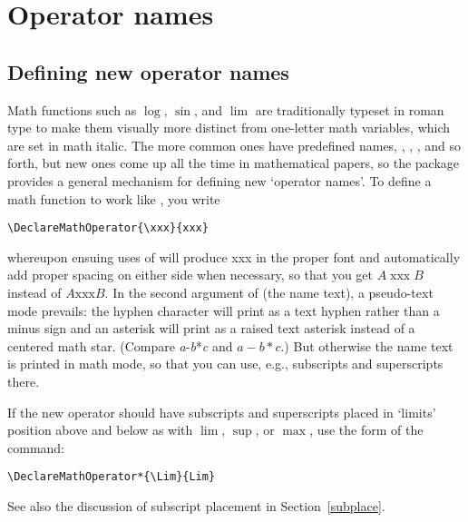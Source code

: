 \documentclass[leqno,titlepage,openany]{amsldoc}[1999/12/13]
\DeclareMathOperator{\xxx}{xxx}
\begin{document}
\chapter{Operator names}

\section{Defining new operator names}\label{s:opname}

Math functions\relax {} such as $\log$, $\sin$, and $\lim$ are
traditionally typeset in roman type to make them visually more distinct
from one-letter math variables, which are set in math italic. The more
common ones have predefined names, , , , and so
forth, but new ones come up all the time in mathematical papers, so the
 package provides a general mechanism for defining new
`operator names'. To define a math function  to work like
, you write
\begin{verbatim}
\DeclareMathOperator{\xxx}{xxx}
\end{verbatim}
whereupon ensuing uses of  will produce {\upshape xxx} in the
proper font and automatically add proper spacing on either side when necessary, so that you
get $A\xxx B$ instead of $A\mathrm{xxx}B$. In the second argument of
 (the name text), a pseudo-text mode prevails:
the hyphen character \qc{\-} will print as a text hyphen rather than a
minus sign and an asterisk \qc{\*} will print as a raised text asterisk
instead of a centered math star. (Compare
\textit{a}-\textit{b}*\textit{c} and $a-b*c$.) But otherwise the name
text is printed in math mode, so that you can use, e.g., subscripts and
superscripts there.

If the new operator should have subscripts and superscripts placed in
`limits' position above and below as with $\lim$, $\sup$, or $\max$, use
the \qc{\*} form of the  command:
\begin{verbatim}
\DeclareMathOperator*{\Lim}{Lim}
\end{verbatim}
See also the discussion of subscript placement in
Section~\ref{subplace}.
\end{document}
